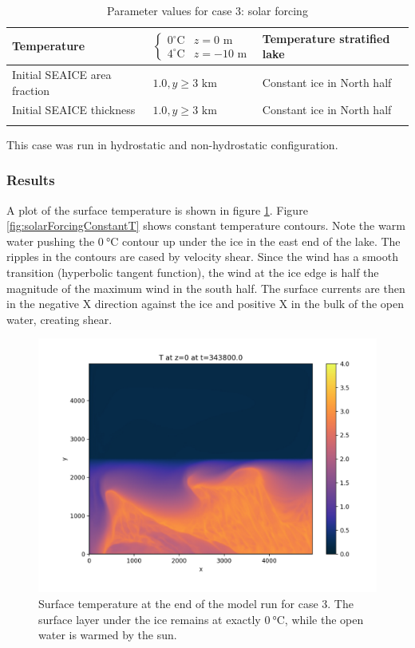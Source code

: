 \documentclass[11pt]{article}
\begin{document}
\begin{longtable}{  p{}  p{}  p{}  }
Temperature & \begin{equation*} \begin{cases} 0^{\circ} \text{C} & z = 0 \text{ m} \\ 4 ^{\circ} \text{C} & z = -10 \text{ m}   \end{cases} \end{equation*} & Temperature stratified lake \\ \hline
Initial SEAICE area fraction   & $1.0, y \geq 3 \text{ km}$ & Constant ice in North half \\ \hline
Initial SEAICE thickness    & $1.0, y \geq 3 \text{ km}$ & Constant ice in North half \\ \hline

\caption{Parameter values for case 3: solar forcing}
\label{table:solarForcing}
\end{longtable}
This case was run in hydrostatic and non-hydrostatic configuration.

\subsubsection{Results}
A plot of the surface temperature is shown in figure \ref{fig:solarForcingSurfaceT}. Figure \ref{fig:solarForcingConstantT} shows constant temperature contours. Note the warm water pushing the $\SI{0}{\celsius}$ contour up under the ice in the east end of the lake. The ripples in the contours are cased by velocity shear. Since the wind has a smooth transition (hyperbolic tangent function), the wind at the ice edge is half the magnitude of the maximum wind in the south half. The surface currents are then in the negative X direction against the ice and positive X in the bulk of the open water, creating shear.

\begin{figure}[h!]
\centering
\includegraphics[width=0.85\linewidth]{solarForcing/solarforcing-surface-T-0000034380}
\caption{Surface temperature at the end of the model run for case 3. The surface layer under the ice remains at exactly $\SI{0}{\celsius}$, while the open water is warmed by the sun.}
\label{fig:solarForcingSurfaceT}
\end{figure}
\end{document}
